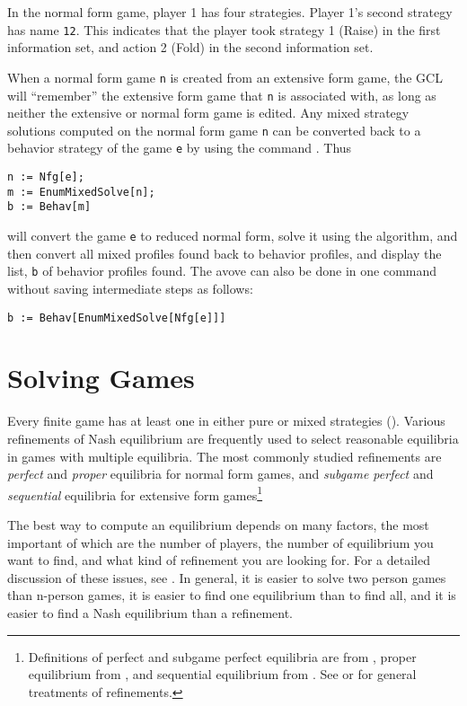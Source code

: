 In the normal form game, player 1 has four strategies.  Player 1's
second strategy has name \verb+12+.  This indicates that the player
took strategy 1 (Raise) in the first information set, and action 2
(Fold) in the second information set.  

When a normal form game \verb+n+ is created from an extensive form
game, the GCL will ``remember'' the extensive form game that \verb+n+
is associated with, as long as neither the extensive or normal form
game is edited.  Any mixed strategy solutions computed on the normal
form game \verb+n+ can be converted back to a behavior strategy of the
game \verb+e+ by using the command .  Thus

\begin{verbatim}
n := Nfg[e];
m := EnumMixedSolve[n];
b := Behav[m]
\end{verbatim}

\noindent
will convert the game \verb+e+ to reduced normal form, solve it using
the  algorithm, and then convert all mixed profiles found back
to behavior profiles, and display the list, \verb+b+ of behavior
profiles found. The avove can also be done in one command without saving
intermediate steps as follows:  
  
\begin{verbatim}
b := Behav[EnumMixedSolve[Nfg[e]]]
\end{verbatim}

\chapter{Solving Games}

Every finite game has at least one  in either pure or mixed
strategies (\cite{Nash:1950}).  Various refinements of Nash
equilibrium are frequently used to select reasonable equilibria in
games with multiple equilibria.  The most commonly studied refinements
are {\em perfect} and {\em proper} equilibria for normal form games,
and {\em subgame perfect} and {\em sequential} equilibria for
extensive form games\footnote{Definitions of perfect and subgame perfect
equilibria are from \cite{Selten:1975}, proper equilibrium from
\cite{Myerson:78}, and sequential equilibrium from
\cite{KrepsWilson:1982}.  See \cite{vanDamme:1987} or \cite{Mye:91}
for general treatments of refinements.}

The best way to compute an equilibrium depends on many factors, the
most important of which are the number of players, the number of
equilibrium you want to find, and what kind of refinement you are
looking for.  For a detailed discussion of these issues, see
\cite{McKMcL:1996}.  In general, it is easier to solve two person
games than n-person games, it is easier to find one equilibrium than
to find all, and it is easier to find a Nash equilibrium than a
refinement.

